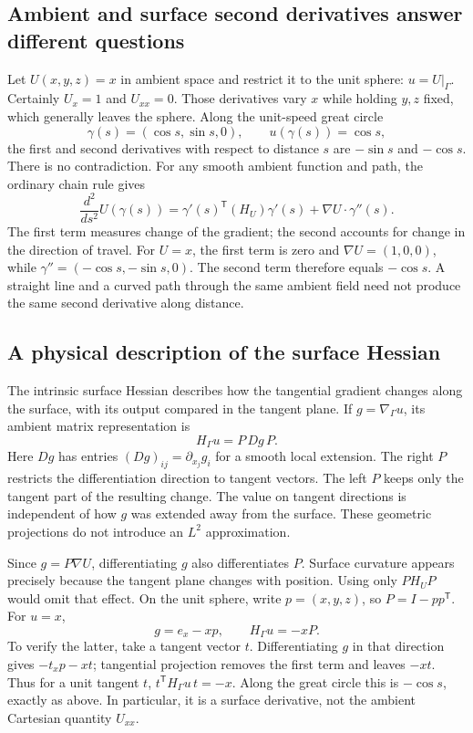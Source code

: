 \subsection{Ambient and surface second derivatives answer different questions}
Let $U(x,y,z)=x$ in ambient space and restrict it to the unit sphere:
$u=U|_\Gamma$. Certainly $U_x=1$ and $U_{xx}=0$. Those derivatives vary
$x$ while holding $y,z$ fixed, which generally leaves the sphere. Along
the unit-speed great circle
\begin{equation}
 \gamma(s)=(\cos s,\sin s,0),\qquad
 u(\gamma(s))=\cos s,
\end{equation}
the first and second derivatives with respect to distance $s$ are
$-\sin s$ and $-\cos s$. There is no contradiction. For any smooth ambient
function and path, the ordinary chain rule gives
\begin{equation}
 \frac{d^2}{ds^2}U(\gamma(s))
 =\gamma'(s)^{\mathsf T}(H_U)\gamma'(s)
       +\nabla U\cdot\gamma''(s).
 \label{eq:app-path-second}
\end{equation}
The first term measures change of the gradient; the second accounts for
change in the direction of travel. For $U=x$, the first term is zero and
$\nabla U=(1,0,0)$, while
$\gamma''=(-\cos s,-\sin s,0)$. The second term therefore equals
$-\cos s$. A straight line and a curved path through the same ambient field
need not produce the same second derivative along distance.

\subsection{A physical description of the surface Hessian}
The intrinsic surface Hessian describes how the tangential gradient changes
along the surface, with its output compared in the tangent plane. If
$g=\nabla_\Gamma u$, its ambient matrix representation is
\begin{equation}
 H_\Gamma u=P\,Dg\,P.
 \label{eq:app-surface-hessian}
\end{equation}
Here $Dg$ has entries $(Dg)_{ij}=\partial_{x_j}g_i$ for a smooth local
extension. The right $P$ restricts the differentiation direction to tangent
vectors. The left $P$ keeps only the tangent part of the resulting change.
The value on tangent directions is independent of how $g$ was extended
away from the surface. These geometric projections do not introduce an
$L^2$ approximation.

Since $g=P\nabla U$, differentiating $g$ also differentiates $P$. Surface
curvature appears precisely because the tangent plane changes with position.
Using only $P H_U P$ would omit that effect. On the unit sphere, write
$p=(x,y,z)$, so $P=I-pp^{\mathsf T}$. For $u=x$,
\begin{equation}
 g=e_x-xp,\qquad H_\Gamma u=-xP.
\end{equation}
To verify the latter, take a tangent vector $t$. Differentiating $g$ in that
direction gives $-t_xp-xt$; tangential projection removes the first term
and leaves $-xt$. Thus for a unit tangent $t$,
$t^{\mathsf T}H_\Gamma u\,t=-x$. Along the great circle this is
$-\cos s$, exactly as above. In particular, it is a surface derivative,
not the ambient Cartesian quantity $U_{xx}$.

